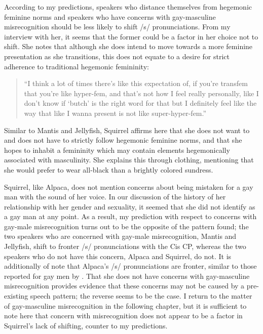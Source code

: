 \documentclass[12pt,twoside]{reedthesis}
\begin{document}
According to my predictions, speakers who distance themselves from hegemonic feminine norms and speakers who have concerns with gay-masculine misrecognition should be less likely to shift /s/ pronunciations. From my interview with her, it seems that the former could be a factor in her choice not to shift. She notes that although she does intend to move towards a more feminine presentation as she transitions, this does not equate to a desire for strict adherence to traditional hegemonic femininity:
\begin{quote}
``I think a lot of times there's like this expectation of, if you're transfem that you're like hyper-fem, and that's not how I feel really personally, like I don't know if `butch' is the right word for that but I definitely feel like the way that like I wanna present is not like super-hyper-fem.''
\end{quote}
Similar to Mantis and Jellyfish, Squirrel affirms here that she does not want to and does not have to strictly follow hegemonic feminine norms, and that she hopes to inhabit a femininity which may contain elements hegemonically associated with masculinity. She explains this through clothing, mentioning that she would prefer to wear all-black than a brightly colored sundress.

Squirrel, like Alpaca, does not mention concerns about being mistaken for a gay man with the sound of her voice. In our discussion of the history of her relationship with her gender and sexuality, it seemed that she did not identify as a gay man at any point. As a result, my prediction with respect to concerns with gay-male misrecognition turns out to be the opposite of the pattern found; the two speakers who are concerned with gay-male misrecognition, Mantis and Jellyfish, shift to fronter /s/ pronunciations with the Cis CP, whereas the two speakers who do not have this concern, Alpaca and Squirrel, do not. It is additionally of note that Alpaca's /s/ pronunciations are fronter, similar to those reported for gay men by \textcite{podesva_sexuality_2015}. That she does not have concerns with gay-masculine misrecognition provides evidence that these concerns may not be caused by a pre-existing speech pattern; the reverse seems to be the case. I return to the matter of gay-masculine misrecognition in the following chapter, but it is sufficient to note here that concern with misrecognition does not appear to be a factor in Squirrel's lack of shifting, counter to my predictions.
\end{document}
